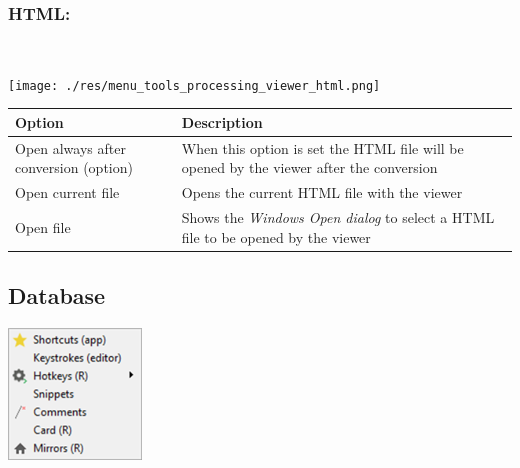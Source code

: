 \hypertarget{menu_tools_processing_viewer_html}{}
\subsubsection{HTML:}\\

\texttt{[image: ./res/menu\_tools\_processing\_viewer\_html.png]}\\

\begin{scriptsize}
  \begin{tabularx}{\textwidth}{>{\hsize=0.7\hsize}X>{\hsize=0.7\hsize}X}\\
    \hline
    \textbf{Option} & \textbf{Description} \\
    \hline
    Open always after conversion (option) & When this option is set the HTML file will be opened
     by the viewer after the conversion \\
    \hdashline[1pt/1pt]
    Open current file & Opens the current HTML file with the viewer \\
    Open file & Shows the \textit{Windows Open dialog} to select a HTML file to be opened by the viewer \\
    \hline
  \end{tabularx}
\end{scriptsize}


\hypertarget{menu_tools_database}{}
\subsection{Database}

\includegraphics[scale=0.8]{./res/menu_tools_database.png}\\

